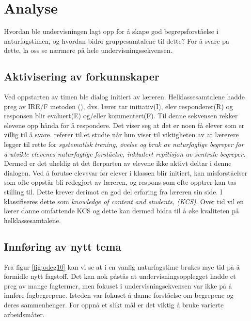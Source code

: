 \documentclass[main.tex]{subfiles}
\begin{document}
\section*{Analyse}
\label{sec:2}

Hvordan ble undervisningen lagt opp for å skape god begrepsforståelse i naturfagstimen, og hvordan 
bidro gruppesamtalene til dette? For å svare på dette, la oss se nærmere på hele 
undervisningssekvensen.


\subsection*{Aktivisering av forkunnskaper}
Ved oppstarten av timen ble dialog initiert av læreren. Helklassesamtalene hadde preg av
IRE/F metoden (), dvs. lærer tar initiativ(I), elev responderer(R) og responsen blir 
evaluert(E) og/eller kommentert(F). Til denne sekvensen rekker elevene opp hånda for å respondere. 
Det viser seg at det er noen få elever som er villig til å svare.  referer til 
et studie når hun viser til viktigheten av at lærerere legger til rette for \emph{systematisk 
trening, øvelse og bruk av naturfaglige begreper for å utvikle elevenes naturfaglige forståelse, 
inkludert repitisjon av sentrale begreper.} Dermed er det uheldig at det flerparten av elevene
ikke aktivt deltar i denne dialogen.
\newline
\newline
Ved å forutse elevsvar før elever i klassen blir initiert, kan misforståelser som 
ofte oppstår bli redegjort av læreren, og respons som ofte opptrer kan tas stilling til. Dette krever 
derimot en god del erfaring fra læreren sin side. I  klassifiseres dette som 
\emph{knowledge of content and students, (KCS)}. Over tid vil en lærer danne omfattende KCS og dette 
kan dermed bidra til å øke kvaliteten på helklassesamtalene. 

\subsection*{Innføring av nytt tema}
Fra figur \ref{fig:odeg10} kan vi se at i en vanlig naturfagstime brukes mye tid på å formidle 
nytt fagstoff. Det kan nok påstås at undervisningsopplegget hadde et preg av mange fagtermer, men 
fokuset i undervisningsekvensen var ikke på å innføre fagbegrepene. Isteden var fokuset å danne forståelse 
om begrepene og deres sammenhenger. For oppnå et slikt mål er det viktig å bruke varierte 
arbeidsmåter. %
\end{document}
